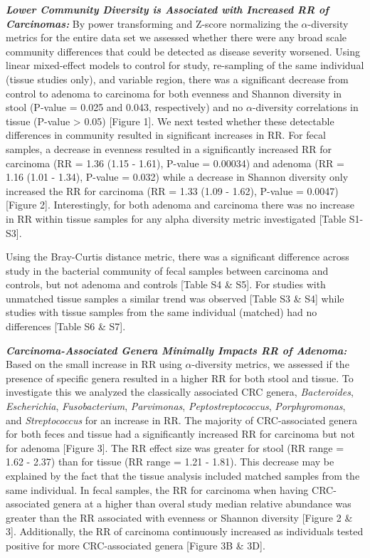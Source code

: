 \documentclass[12pt,]{article}
\begin{document}
\textbf{\emph{Lower Community Diversity is Associated with Increased RR
of Carcinomas:}} By power transforming and Z-score normalizing the
\(\alpha\)-diversity metrics for the entire data set we assessed whether
there were any broad scale community differences that could be detected
as disease severity worsened. Using linear mixed-effect models to
control for study, re-sampling of the same individual (tissue studies
only), and variable region, there was a significant decrease from
control to adenoma to carcinoma for both evenness and Shannon diversity
in stool (P-value = 0.025 and 0.043, respectively) and no
\(\alpha\)-diversity correlations in tissue (P-value \textgreater{}
0.05) {[}Figure 1{]}. We next tested whether these detectable
differences in community resulted in significant increases in RR. For
fecal samples, a decrease in evenness resulted in a significantly
increased RR for carcinoma (RR = 1.36 (1.15 - 1.61), P-value = 0.00034)
and adenoma (RR = 1.16 (1.01 - 1.34), P-value = 0.032) while a decrease
in Shannon diversity only increased the RR for carcinoma (RR = 1.33
(1.09 - 1.62), P-value = 0.0047) {[}Figure 2{]}. Interestingly, for both
adenoma and carcinoma there was no increase in RR within tissue samples
for any alpha diversity metric investigated {[}Table S1-S3{]}.

Using the Bray-Curtis distance metric, there was a significant
difference across study in the bacterial community of fecal samples
between carcinoma and controls, but not adenoma and controls {[}Table S4
\& S5{]}. For studies with unmatched tissue samples a similar trend was
observed {[}Table S3 \& S4{]} while studies with tissue samples from the
same individual (matched) had no differences {[}Table S6 \& S7{]}.

\textbf{\emph{Carcinoma-Associated Genera Minimally Impacts RR of
Adenoma:}} Based on the small increase in RR using \(\alpha\)-diversity
metrics, we assessed if the presence of specific genera resulted in a
higher RR for both stool and tissue. To investigate this we analyzed the
classically associated CRC genera, \emph{Bacteroides},
\emph{Escherichia}, \emph{Fusobacterium}, \emph{Parvimonas},
\emph{Peptostreptococcus}, \emph{Porphyromonas}, and
\emph{Streptococcus} for an increase in RR. The majority of
CRC-associated genera for both feces and tissue had a significantly
increased RR for carcinoma but not for adenoma {[}Figure 3{]}. The RR
effect size was greater for stool (RR range = 1.62 - 2.37) than for
tissue (RR range = 1.21 - 1.81). This decrease may be explained by the
fact that the tissue analysis included matched samples from the same
individual. In fecal samples, the RR for carcinoma when having
CRC-associated genera at a higher than overal study median relative
abundance was greater than the RR associated with evenness or Shannon
diversity {[}Figure 2 \& 3{]}. Additionally, the RR of carcinoma
continuously increased as individuals tested positive for more
CRC-associated genera {[}Figure 3B \& 3D{]}.
\end{document}

